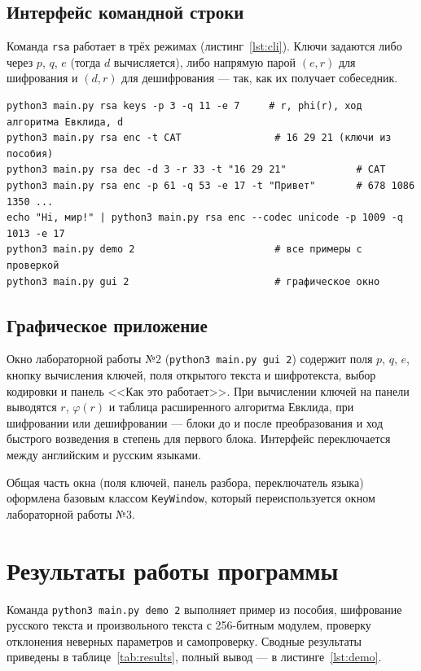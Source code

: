 \documentclass[14pt,a4paper]{extarticle}
\begin{document}
\subsection{Интерфейс командной строки}

Команда \texttt{rsa} работает в трёх режимах (листинг~\ref{lst:cli}). Ключи задаются
либо через $p$, $q$, $e$ (тогда $d$ вычисляется), либо напрямую парой $(e, r)$ для
шифрования и $(d, r)$ для дешифрования --- так, как их получает собеседник.

\begin{lstlisting}[style=shell, caption={Примеры запуска}, label={lst:cli}]
python3 main.py rsa keys -p 3 -q 11 -e 7     # r, phi(r), ход алгоритма Евклида, d
python3 main.py rsa enc -t CAT                # 16 29 21 (ключи из пособия)
python3 main.py rsa dec -d 3 -r 33 -t "16 29 21"            # CAT
python3 main.py rsa enc -p 61 -q 53 -e 17 -t "Привет"       # 678 1086 1350 ...
echo "Hi, мир!" | python3 main.py rsa enc --codec unicode -p 1009 -q 1013 -e 17
python3 main.py demo 2                        # все примеры с проверкой
python3 main.py gui 2                         # графическое окно
\end{lstlisting}

\subsection{Графическое приложение}

Окно лабораторной работы №2 (\texttt{python3 main.py gui 2}) содержит поля $p$, $q$,
$e$, кнопку вычисления ключей, поля открытого текста и шифротекста, выбор кодировки
и панель <<Как это работает>>. При вычислении ключей на панели выводятся $r$,
$\varphi(r)$ и таблица расширенного алгоритма Евклида, при шифровании или
дешифровании --- блоки до и после преобразования и ход быстрого возведения в степень
для первого блока. Интерфейс переключается между английским и русским языками.

Общая часть окна (поля ключей, панель разбора, переключатель языка) оформлена базовым
классом \texttt{KeyWindow}, который переиспользуется окном лабораторной работы №3.

\section{Результаты работы программы}

Команда \texttt{python3 main.py demo 2} выполняет пример из пособия, шифрование
русского текста и произвольного текста с 256-битным модулем, проверку отклонения
неверных параметров и самопроверку. Сводные результаты приведены в
таблице~\ref{tab:results}, полный вывод --- в листинге~\ref{lst:demo}.
\end{document}
